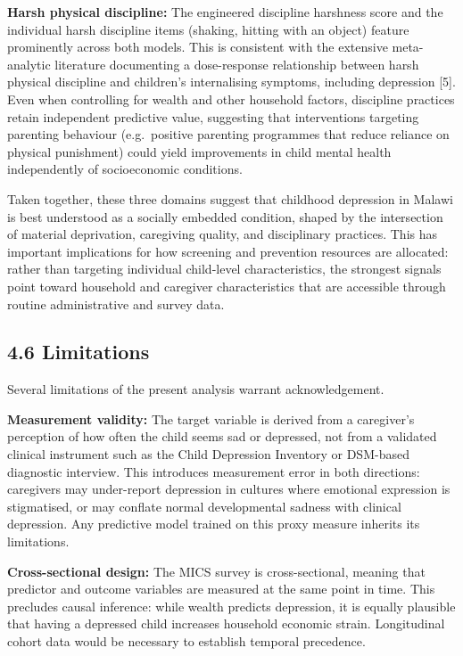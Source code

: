 \documentclass[11pt]{article}
\begin{document}
\textbf{Harsh physical discipline:} The engineered discipline harshness
score and the individual harsh discipline items (shaking, hitting with
an object) feature prominently across both models. This is consistent
with the extensive meta-analytic literature documenting a dose-response
relationship between harsh physical discipline and children's
internalising symptoms, including depression {[}5{]}. Even when
controlling for wealth and other household factors, discipline practices
retain independent predictive value, suggesting that interventions
targeting parenting behaviour (e.g.~positive parenting programmes that
reduce reliance on physical punishment) could yield improvements in
child mental health independently of socioeconomic conditions.

Taken together, these three domains suggest that childhood depression in
Malawi is best understood as a socially embedded condition, shaped by
the intersection of material deprivation, caregiving quality, and
disciplinary practices. This has important implications for how
screening and prevention resources are allocated: rather than targeting
individual child-level characteristics, the strongest signals point
toward household and caregiver characteristics that are accessible
through routine administrative and survey data.

    \hypertarget{limitations}{%
\subsection{4.6 Limitations}\label{limitations}}

Several limitations of the present analysis warrant acknowledgement.

\textbf{Measurement validity:} The target variable is derived from a
caregiver's perception of how often the child seems sad or depressed,
not from a validated clinical instrument such as the Child Depression
Inventory or DSM-based diagnostic interview. This introduces measurement
error in both directions: caregivers may under-report depression in
cultures where emotional expression is stigmatised, or may conflate
normal developmental sadness with clinical depression. Any predictive
model trained on this proxy measure inherits its limitations.

\textbf{Cross-sectional design:} The MICS survey is cross-sectional,
meaning that predictor and outcome variables are measured at the same
point in time. This precludes causal inference: while wealth predicts
depression, it is equally plausible that having a depressed child
increases household economic strain. Longitudinal cohort data would be
necessary to establish temporal precedence.
\end{document}
